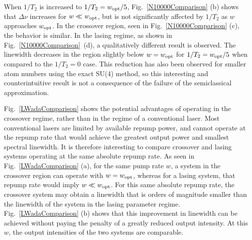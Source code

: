 \documentclass[aps,
twocolumn,
showpacs,
superscriptaddress,groupedaddress]{revtex4}
\begin{document}
When $1/T_2$ is increased to $1/T_2=w_{\rm opt}/5$,
Fig.~\ref{N10000Comparison} (b) shows that $\Delta \nu$ increases for
$w\ll w_{\rm opt}$, but is not significantly affected by $1/T_2$ as
$w$ approaches $w_{\rm opt}$. In the crossover region, seen in
Fig.~\ref{N10000Comparison} (c), the behavior is similar. In the
lasing regime, as shown in Fig.~\ref{N10000Comparison}~(d), a
qualitatively different result is observed. The linewidth decreases in
the region slightly below $w=w_{\rm opt}$ for $1/T_2=w_{\rm opt}/5$
when compared to the $1/T_2=0$ case. This reduction has also been
observed for smaller atom numbers using the exact SU(4) method, so
this interesting and counterintuitive result is not a consequence of
the failure of the semiclassical approximation.

Fig.~\ref{LWadaComparison} shows the potential advantages of operating
in the crossover regime, rather than in the regime of a conventional
laser. Most conventional lasers are limited by available repump power,
and cannot operate at the repump rate that would achieve the greatest
output power and smallest spectral linewidth. It is therefore
interesting to compare crossover and lasing systems operating at the
same absolute repump rate.  As seen in Fig.~\ref{LWadaComparison} (a),
for the same pump rate $w$, a system in the crossover region can
operate with $w=w_{\rm opt}$, whereas for a lasing system, that repump
rate would imply $w\ll w_{\rm opt}$. For this same absolute repump
rate, the crossover system may obtain a linewidth that is orders of
magnitude smaller than the linewidth of the system in the lasing
parameter regime.  Fig.~\ref{LWadaComparison} (b) shows that this
improvement in linewidth can be achieved without paying the penalty of
a greatly reduced output intensity. At this $w$, the output
intensities of the two systems are comparable. 
\end{document}
